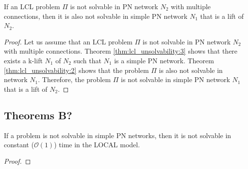 

%
\begin{theorem} \label{thm:lcl_unsolvability:4}
    If an LCL problem $\Pi$ is not solvable in PN network $N_2$ with multiple connections, then it is also not solvable in simple PN network $N_1$ that is a lift of $N_2$.
\end{theorem}
\begin{proof}
    Let us assume that an LCL problem $\Pi$ is not solvable in PN network $N_2$ with multiple connections.
    Theorem \ref{thm:lcl_unsolvability:3} shows that there exists a k-lift $N_1$ of $N_2$ such that $N_1$ is a simple PN network.
    Theorem \ref{thm:lcl_unsolvability:2} shows that the problem $\Pi$ is also not solvable in network $N_1$.
    Therefore, the problem $\Pi$ is not solvable in simple PN network $N_1$ that is a lift of $N_2$.
\end{proof}

\subsection{Theorems B?} \label{sec:algorithm:theorems:b}

\begin{theorem} \label{thm:lcl_unsolvability:5}
    If a problem is not solvable in simple PN networks, then it is not solvable in constant ($\mathcal{O}(1)$) time in the LOCAL model.
\end{theorem}
\begin{proof}
\end{proof}